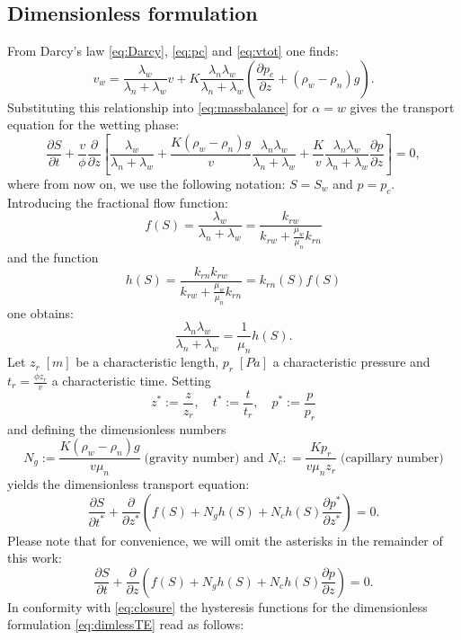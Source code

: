 \documentclass[smallextended]{svjour3}       %
\begin{document}
\subsection{Dimensionless formulation}
From Darcy's law \eqref{eq:Darcy}, \eqref{eq:pc} and \eqref{eq:vtot} one finds:
$$
v_w = \frac{\lambda_w}{\lambda_n + \lambda_w} v + K \frac{\lambda_n \lambda_w}{\lambda_n + \lambda_w} \left( \frac{ \partial p_c }{ \partial z} + \left(\rho_w-\rho_n \right)g \right).
$$
Substituting this relationship into \eqref{eq:massbalance} for $\alpha = w$ gives the transport equation for the wetting phase:
$$
\frac{\partial S}{\partial t} + \frac{v}{\phi} \frac{\partial}{\partial z} \left[ \frac{\lambda_w}{\lambda_n + \lambda_w} +
\frac{K \left(\rho_w-\rho_n \right) g}{v} \frac{\lambda_n \lambda_w}{\lambda_n + \lambda_w} + \frac{K}{v}\frac{\lambda_n \lambda_w}{\lambda_n + \lambda_w}
\frac{\partial p}{\partial z} \right] = 0,
$$
where from now on, we use the following notation: $S = S_w$ and $p = p_c$. Introducing the fractional flow function:
$$
f\left(S \right) = \frac{\lambda_w}{\lambda_n + \lambda_w} = \frac{k_{rw}}{k_{rw}+ \frac{\mu_w}{\mu_n}k_{rn}}
$$
and the function 
$$
h\left(S \right) = \frac{k_{rn} k_{rw}}{k_{rw} + \frac{\mu_w}{\mu_n} k_{rn}} = k_{rn}\left(S \right) f\left(S \right)
$$
one obtains:
$$
\frac{\lambda_n \lambda_w}{\lambda_n + \lambda_w} = \frac{1}{\mu_n} h\left( S \right).
$$
Let $z_r\;\left[\unit{m} \right]$ be a characteristic length, $p_r\;\left[\unit{Pa} \right]$ a characteristic pressure and
$t_r = \frac{\phi z_r}{v}$ a characteristic time. Setting
$$
z^\ast := \frac{z}{z_r},\quad t^\ast := \frac{t}{t_r},\quad p^\ast := \frac{p}{p_r}
$$
and defining the dimensionless numbers
$$
N_g := \frac{K\left(\rho_w - \rho_n \right) g}{v \mu_n}\;\text{(gravity number) and }
N_c : = \frac{K p_r}{v \mu_n z_r}\;\text{(capillary number)}
$$
yields the dimensionless transport equation:
$$
\frac{\partial S}{\partial t^\ast} +  \frac{\partial}{\partial z^\ast}\left( f\left(S \right) + N_g h\left(S \right) + N_c h\left(S \right) \frac{\partial p^\ast}{\partial z^\ast} \right) = 0.
$$
Please note that for convenience, we will omit the asterisks in the remainder of this work:
\begin{equation}
\label{eq:dimlessTE}
\frac{\partial S}{\partial t} +  \frac{\partial}{\partial z}\left( f\left(S \right) + N_g h\left(S \right) + N_c h\left(S \right) \frac{\partial p}{\partial z} \right) = 0.
\end{equation}
In conformity with \eqref{eq:closure} the hysteresis functions for the dimensionless formulation \eqref{eq:dimlessTE} read as follows:
\end{document}

